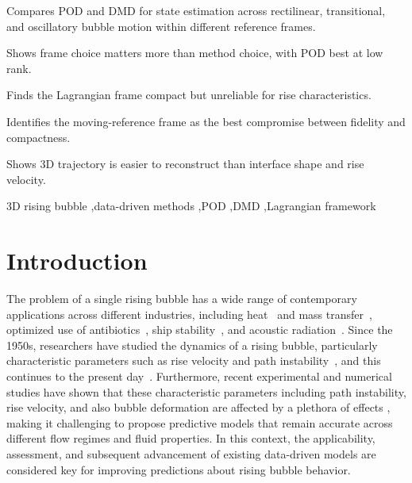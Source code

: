 \documentclass[a4paper,fleqn]{cas-sc}
\begin{document}
	\begin{highlights}
		\item Compares POD and DMD for state estimation across rectilinear, transitional, and oscillatory bubble motion within different reference frames.
		\item Shows frame choice matters more than method choice, with POD best at low rank.
		\item Finds the Lagrangian frame compact but unreliable for rise characteristics.
		\item Identifies the moving-reference frame as the best compromise between fidelity and compactness.
		\item Shows 3D trajectory is easier to reconstruct than interface shape and rise velocity.
	\end{highlights}
	
	\begin{keywords}
		3D rising bubble \sep data-driven methods \sep POD \sep DMD \sep Lagrangian framework
	\end{keywords}

	\maketitle
	\linenumbers
	

	\section{Introduction}
	\label{Introduction}
	
	The problem of a single rising bubble has a wide range of contemporary applications across different industries, including heat~\cite{Larimi2018} and mass transfer~\cite{Kentheswaran2023}, optimized use of antibiotics~\cite{Hamdollahi2022}, ship stability~\cite{Fang2022}, and acoustic radiation~\cite{Ouyang2021}. Since the 1950s, researchers have studied the dynamics of a rising bubble, particularly characteristic parameters such as rise velocity and path instability~\cite{Saffman1956,TSUGE1977,Duineveld1995}, and this continues to the present day~\cite{Shi2024,Bonnefis2024,Hosen2024}. Furthermore, recent experimental and numerical studies have shown that these characteristic parameters including path instability, rise velocity, and also bubble deformation are affected by a plethora of effects \cite{Liu2006,Cano-Lozano2016,Kure2021}, making it challenging to propose predictive models that remain accurate across different flow regimes and fluid properties. In this context, the applicability, assessment, and subsequent advancement of existing data-driven models are considered key for improving predictions about rising bubble behavior.
	
\end{document}
